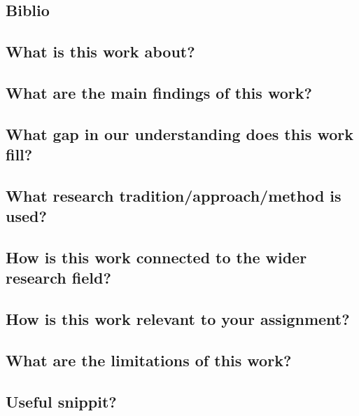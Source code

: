 \documentclass[a4paper]{report}
\begin{document}
\section{ \cite{}}
\subsection{Biblio}
\subsection{What is this work about?}
\subsection{What are the main findings of this work?}
\subsection{What gap in our understanding does this work fill?}
\subsection{What research tradition/approach/method is used?}
\subsection{How is this work connected to the wider research field?}
\subsection{How is this work relevant to your assignment?}
\subsection{What are the limitations of this work?}
\subsection{Useful snippit?}
\end{document}
